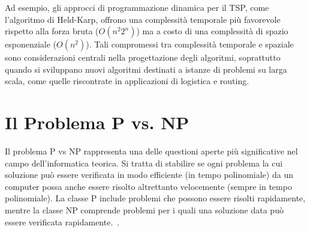 Ad esempio, gli approcci di programmazione dinamica per il \Gls{TSP}, come l'algoritmo di Held-Karp, offrono una complessità temporale più favorevole rispetto alla forza bruta (\(O(n^2 2^n)\)) ma a costo di una complessità di spazio esponenziale (\(O(n^2)\)). Tali compromessi tra complessità temporale e spaziale sono considerazioni centrali nella progettazione degli algoritmi, soprattutto quando si sviluppano nuovi algoritmi destinati a istanze di problemi su larga scala, come quelle riscontrate in applicazioni di logistica e routing.

\section{Il Problema \Gls{P} vs. \Gls{NP} }

Il problema \Gls{P} vs \Gls{NP} rappresenta una delle questioni aperte più significative nel campo dell'informatica teorica. Si tratta di stabilire se ogni problema la cui soluzione può essere verificata in modo efficiente (in tempo polinomiale) da un computer possa anche essere risolto altrettanto velocemente (sempre in tempo polinomiale). La classe \Gls{P} include problemi che possono essere risolti rapidamente, mentre la classe \Gls{NP} comprende problemi per i quali una soluzione data può essere verificata rapidamente.~\cite{PvsNP}.
